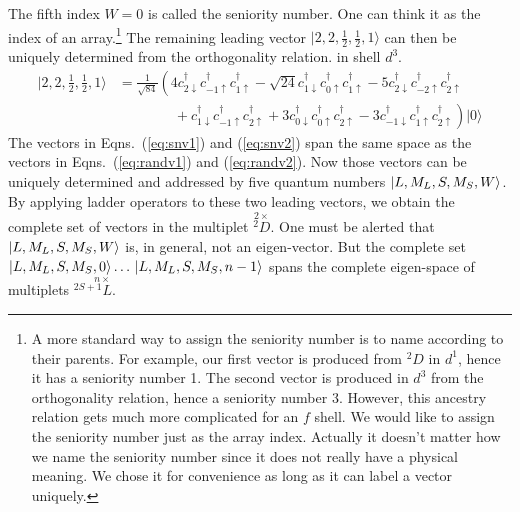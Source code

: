 %
The fifth index $W=0$ is called the seniority number. One can think it as
the index of an array.\footnote{A more standard way to assign the seniority number
is to name according to their parents. For example, our first vector is produced from
$^2D$ in $d^1$, hence it has a seniority number 1. The second vector is produced
in $d^3$ from the orthogonality relation, hence a seniority number 3. However,
this ancestry relation gets much more complicated for an $f$ shell. We would
like to assign the seniority number just as the array index. Actually
it doesn't matter how we name the seniority number since it does not really
have a physical meaning. We chose it for convenience as long as it can label
a vector uniquely.}
The remaining leading vector $|2,2,\frac{1}{2},\frac{1}{2},1\rangle$
can then be uniquely determined from the orthogonality relation.
in shell $d^3$.
\begin{align} \label{eq:snv2}
|2,2,\frac{1}{2},\frac{1}{2},1\rangle & = \frac{1}{\sqrt{84}} \left( 4c_{2\downarrow}^\dagger c_{-1\uparrow}^\dagger c_{1\uparrow}^\dagger -\sqrt{24}c_{1\downarrow}^\dagger c_{0\uparrow}^\dagger c_{1\uparrow}^\dagger -5c_{2\downarrow}^\dagger c_{-2\uparrow}^\dagger c_{2\uparrow}^\dagger \right. \nonumber \\
& \left. \qquad\qquad +c_{1\downarrow}^\dagger c_{-1\uparrow}^\dagger c_{2\uparrow}^\dagger +3c_{0\downarrow}^\dagger c_{0\uparrow}^\dagger c_{2\uparrow}^\dagger -3c_{-1\downarrow}^\dagger c_{1\uparrow}^\dagger c_{2\uparrow}^\dagger \right)|0\rangle
\end{align}
%
The vectors in Eqns.~(\ref{eq:snv1}) and (\ref{eq:snv2}) span the same space
as the vectors in Eqns.~(\ref{eq:randv1}) and (\ref{eq:randv2}). Now those vectors
can be uniquely determined and addressed by five quantum numbers $\Ket{L,M_L,S,M_S,W}$.
By applying ladder operators to these two leading vectors,
we obtain the complete set of vectors in the multiplet $\stackrel{2\times}{^2D}$.
One must be alerted that $\Ket{L,M_L,S,M_S,W}$ is, in general, not an eigen-vector.
But the complete set $\Ket{L,M_L,S,M_S,0}\ldots\, \Ket{L,M_L,S,M_S,n-1}$ spans the complete
eigen-space of multiplets $\stackrel{\qquad n\times}{^{2S+1}L}$.

